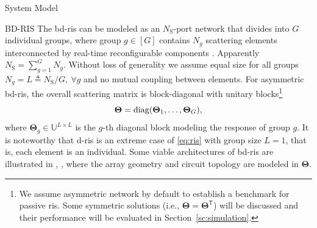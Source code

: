 \documentclass[journal]{IEEEtran}
\begin{document}
\begin{section}{System Model}
	\begin{subsection}{BD-RIS}
		The \gls{bd}-\gls{ris} can be modeled as an $N_\mathrm{S}$-port network \cite{Ivrlac2010} that divides into $G$ individual groups, where group $g \in [G]$ contains $N_g$ scattering elements interconnected by real-time reconfigurable components \cite{Shen2020a}.
		Apparently $N_\mathrm{S} = \sum_{g=1}^G N_g$.
		Without loss of generality we assume equal size for all groups $N_g = L \triangleq N_\mathrm{S} / G, \ \forall g$ and no mutual coupling between elements.
		For asymmetric \gls{bd}-\gls{ris}, the overall scattering matrix is block-diagonal with unitary blocks\footnote{We assume asymmetric network by default to establish a benchmark for passive \gls{ris}. Some symmetric solutions (i.e., $\mathbf{\Theta} = \mathbf{\Theta}^\mathsf{T}$) will be discussed and their performance will be evaluated in Section~\ref{sc:simulation}.}
		\begin{equation}
			\label{eq:ris}
			\mathbf{\Theta} = \operatorname{diag}(\mathbf{\Theta}_1,\ldots,\mathbf{\Theta}_G),
		\end{equation}
		where $\mathbf{\Theta}_g \in \mathbb{U}^{L \times L}$ is the $g$-th diagonal block modeling the response of group $g$.
		It is noteworthy that \gls{d}-\gls{ris} is an extreme case of \eqref{eq:ris} with group size $L=1$, that is, each element is an individual.
		Some viable architectures of \gls{bd}-\gls{ris} are illustrated in \cite[Fig. 3]{Shen2020a}, \cite[Fig. 5]{Li2023c}, \cite[Fig. 2]{Nerini2024} where the array geometry and circuit topology are modeled in $\mathbf{\Theta}$.
	\end{subsection}


\end{section}
\end{document}
